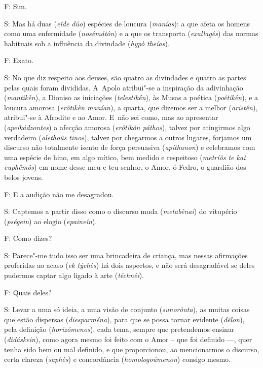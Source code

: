  

F: Sim.

 

S: Mas há duas (\emph{eîde dúo}) espécies de loucura (\emph{manías}): a
que afeta os homens como uma enfermidade (\emph{nosêmátôn}) e a que os
transporta (\emph{exallagês}) das normas habituais sob a influência da
divindade (\emph{hypò theías}).

 

\bekker{[265b]} F: Exato.

 

S: No que diz respeito aos deuses, são quatro as divindades e quatro as
partes pelas quais foram divididas. A~Apolo atribui"-se a inspiração da
adivinhação (\emph{mantikḕn}), a Dioniso as iniciações
(\emph{telestikḗn}), às Musas a poética (\emph{poêtikḗn}), e a loucura
amorosa (\emph{erôtikḕn manían}), a quarta, que dizemos ser a melhor
(\emph{arístên}), atribui"-se à Afrodite e ao Amor. E~não sei como, mas
ao apresentar (\emph{apeikádzontes}) a afecção amorosa (\emph{erôtikòn
páthos}), talvez por atingirmos algo verdadeiro (\emph{alethoûs tinos}),
talvez por chegarmos a outros lugares, forjamos um discurso não
totalmente isento de força persuasiva (\emph{apíthanon}) e celebramos
com uma espécie de hino, em algo mítico, \bekker{[265c]} bem medido e
respeitoso (\emph{metríôs te kaì euphḗmôs}) em nome desse meu e teu
senhor, o Amor, ó Fedro, o guardião dos belos jovens.

 

F: E a audição não me desagradou.

 

S: Captemos a partir disso como o discurso muda (\emph{metabênai}) do
vitupério (\emph{pségein}) ao elogio (\emph{epaineîn}).

 

F: Como dizes?

 

S: Parece"-me tudo isso ser uma brincadeira de criança, mas nessas
afirmações proferidas ao acaso (\emph{ek týchês}) há dois aspectos, e
não será desagradável se deles pudermos captar algo ligado à arte
(\emph{téchnêi}).

 

\bekker{[265d]} F: Quais deles?

 

S: Levar a uma só ideia, a uma visão de conjunto (\emph{sunorônta}), as
muitas coisas que estão dispersas (\emph{diesparména}), para que se
possa tornar evidente (\emph{dêlon}), pela definição
(\emph{horizómenos}), cada tema, sempre que pretendemos ensinar
(\emph{didáskein}), como agora mesmo foi feito com o Amor -- que foi
definido \mbox{---,} quer tenha sido bem ou mal definido, e que proporcionou, ao
mencionarmos o discurso, certa clareza (\emph{saphès}) e concordância
(\emph{homologoúmenon}) consigo mesmo.

